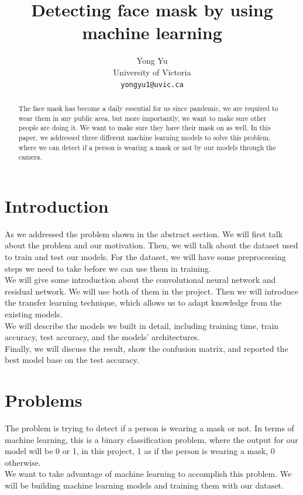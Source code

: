 \documentclass{article}
\title{Detecting face mask by using machine learning}
\author{%
  Yong Yu\\
  University of Victoria\\
  \texttt{yongyu1@uvic.ca} 
}
\begin{document}
\maketitle

\begin{abstract}
  The face mask has become a daily essential for us since pandemic, we are required to wear them in any public area, but more importantly, we want to make sure other people are doing it. We want to make sure they have their mask on as well.
In this paper, we addressed three different machine learning models to solve this problem, where we can detect if a person is wearing a mask or not by our models through the camera.


\end{abstract}

\section{Introduction}

As we addressed the problem shown in the abstract section. We will first talk about the problem and our motivation. Then, we will talk about the dataset used to train and test our models. For the dataset, we will have some preprocessing steps we need to take before we can use them in training. \\
We will give some introduction about the convolutional neural network and residual network. We will use both of them in the project. Then we will introduce the transfer learning technique, which allows us to adapt knowledge from the existing models.\\
We will describe the models we built in detail, including training time, train accuracy, test accuracy, and the models’ architectures.\\
Finally, we will discuss the result, show the confusion matrix, and reported the best model base on the test accuracy.




\section{Problems}
\label{gen_inst}
The problem is trying to detect if a person is wearing a mask or not. In terms of machine learning, this is a binary classification problem, where the output for our model will be 0 or 1, in this project, 1 as if the person is wearing a mask, 0 otherwise. \\
We want to take advantage of machine learning to accomplish this problem. We will be building machine learning models and training them with our dataset. 
\end{document}
